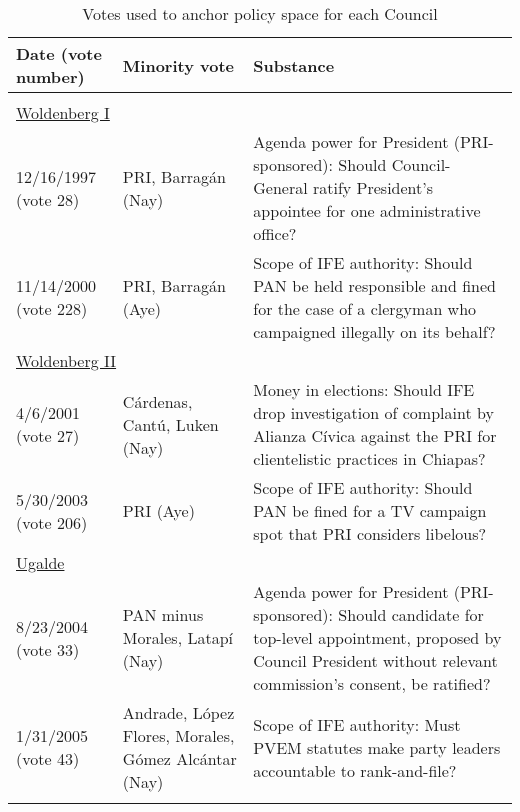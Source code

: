 \documentclass[12 pt, letter]{article}
\begin{document}
\begin{table}
\caption{Votes used to anchor policy space for each Council}\label{T:priors}
\begin{center}
\begin{tabular}{lp{1.5in}p{2.2in}}
\hline
Date (vote number)   & Minority vote & Substance \\ \hline   \\ [-1ex]
\multicolumn{3}{l}{\underline{Woldenberg I}} \\ [1ex]
12/16/1997 (vote 28) & PRI, Barrag\'an (Nay)  & Agenda power for President (PRI-sponsored): Should Council-General ratify President's appointee for one administrative office? \\ [1ex]
11/14/2000 (vote 228)  & PRI, Barrag\'an (Aye) & Scope of IFE authority: Should PAN be held responsible and fined for the case of a clergyman who campaigned illegally on its behalf? \\ [1ex]
\multicolumn{3}{l}{\underline{Woldenberg II}} \\ [1ex]
4/6/2001 (vote 27) & C\'ardenas, Cant\'u, Luken (Nay) & Money in elections: Should IFE drop investigation of complaint by Alianza C\'ivica against the PRI for clientelistic practices in Chiapas? \\ [1ex]
5/30/2003 (vote 206)   & PRI (Aye) & Scope of IFE authority: Should PAN be fined for a TV campaign spot that PRI considers libelous? \\ [1ex]
\multicolumn{3}{l}{\underline{Ugalde}} \\ [1ex]
8/23/2004 (vote 33) &  PAN minus Morales, Latap\'i (Nay) &  Agenda power for President (PRI-sponsored): Should candidate for top-level appointment, proposed by Council President without relevant commission's consent, be ratified? \\ [1ex]
1/31/2005 (vote 43) &  Andrade, L\'opez Flores, Morales, G\'omez Alc\'antar (Nay) & Scope of IFE authority: Must PVEM statutes make party leaders accountable to rank-and-file?\\[0.5ex]\\ \hline
\end{tabular}
\end{center}
\end{table}
\end{document}
